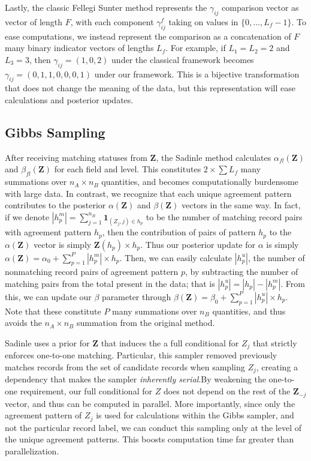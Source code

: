 \documentclass[
  12pt,
]{article}
\begin{document}
Lastly, the classic Fellegi Sunter method represents the \(\gamma_{ij}\)
comparison vector as vector of length \(F\), with each component
\(\gamma_{ij}^f\) taking on values in \(\{0, \ldots, L_f - 1\}\). To
ease computations, we instead represent the comparison as a
concatenation of \(F\) many binary indicator vectors of lengths \(L_f\).
For example, if \(L_1 = L_2 = 2\) and \(L_3 = 3\), then
\(\gamma_{ij} = (1, 0, 2)\) under the classical framework becomes
\(\gamma_{ij} = (0, 1, 1, 0, 0, 0, 1)\) under our framework. This is a
bijective transformation that does not change the meaning of the data,
but this representation will ease calculations and posterior updates.

\hypertarget{gibbs-sampling}{%
\subsection{Gibbs Sampling}\label{gibbs-sampling}}

After receiving matching statuses from \(\mathbf{Z}\), the Sadinle
method calculates \(\alpha_{fl}(\mathbf{Z})\) and
\(\beta_{fl}(\mathbf{Z})\) for each field and level. This constitutes
\(2 \times \sum L_f\) many summations over \(n_A \times n_B\)
quantities, and becomes computationally burdensome with large data. In
contrast, we recognize that each unique agreement pattern contributes to
the posterior \(\alpha(\mathbf{Z})\) and \(\beta(\mathbf{Z})\) vectors
in the same way. In fact, if we denote
\(|h_p^m| = \sum_{j=1}^{n_B} \mathbf{1}_{(Z_j, j) \in h_p}\) to be the
number of matching record pairs with agreement pattern \(h_p\), then the
contribution of pairs of pattern \(h_p\) to the \(\alpha(\mathbf{Z})\)
vector is simply \(\mathbf{Z}(h_p) \times h_p\). Thus our posterior
update for \(\alpha\) is simply
\(\alpha(\mathbf{Z}) = \alpha_0 + \sum_{p=1}^P |h_p^m| \times h_p\).
Then, we can easily calculate \(|h_p^u|\), the number of nonmatching
record pairs of agreement pattern \(p\), by subtracting the number of
matching pairs from the total present in the data; that is
\(|h_p^u| = |h_p| - |h_p^m|\). From this, we can update our \(\beta\)
parameter through
\(\beta(\mathbf{Z}) = \beta_0 + \sum_{p=1}^P |h_p^u| \times h_p\). Note
that these constitute \(P\) many summations over \(n_B\) quantities, and
thus avoids the \(n_A \times n_B\) summation from the original method.

Sadinle uses a prior for \(\mathbf{Z}\) that induces the a full
conditional for \(Z_j\) that strictly enforces one-to-one matching.
Particular, this sampler removed previously matches records from the set
of candidate records when sampling \(Z_j\), creating a dependency that
makes the sampler \emph{inherently serial}.By weakening the one-to-one
requirement, our full conditional for \(Z\) does not depend on the rest
of the \(\mathbf{Z}_{-j}\) vector, and thus can be computed in parallel.
More importantly, since only the agreement pattern of \(Z_j\) is used
for calculations within the Gibbs sampler, and not the particular record
label, we can conduct this sampling only at the level of the unique
agreement patterns. This boosts computation time far greater than
parallelization.
\end{document}
